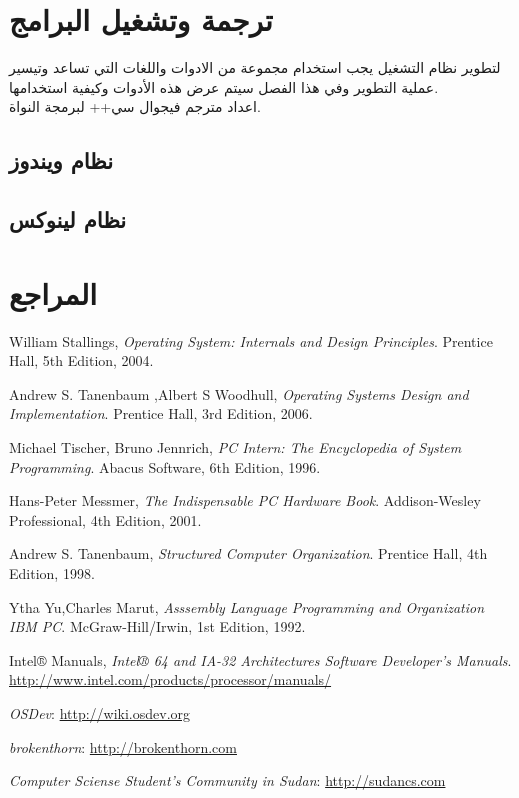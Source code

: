 \documentclass[document.tex]{subfiles}
\begin{document}
\appendix
\chapter{ترجمة وتشغيل البرامج}
\label{apx:compile_link}

لتطوير نظام التشغيل يجب استخدام مجموعة من الادوات واللغات التي تساعد وتيسير عملية التطوير وفي هذا الفصل سيتم عرض هذه الأدوات وكيفية استخدامها.\\

اعداد مترجم فيجوال سي++ لبرمجة النواة.
\section{نظام ويندوز}
\section{نظام لينوكس}

\chapter{المراجع}


\begin{english}
\begin{thebibliography}{10}
 
  William Stallings,
  \emph{Operating System: Internals and Design Principles}.
  Prentice Hall,
  5th Edition,
  2004.
 
  Andrew S. Tanenbaum ,Albert S Woodhull,
  \emph{Operating Systems Design and Implementation}.
  Prentice Hall,
  3rd Edition,
   2006.

  Michael Tischer, Bruno Jennrich,
  \emph{PC Intern: The Encyclopedia of System Programming}.
  Abacus Software,
  6th Edition,
  1996.

  Hans-Peter Messmer,
  \emph{The Indispensable PC Hardware Book}.
  Addison-Wesley Professional,
  4th Edition,
  2001.

  Andrew S. Tanenbaum,
  \emph{Structured Computer Organization}.
  Prentice Hall,
  4th Edition,
  1998.

  Ytha Yu,Charles Marut,
  \emph{Asssembly Language Programming and Organization IBM PC}.
  McGraw-Hill/Irwin,
  1st Edition,
  1992.

  Intel® Manuals,
  \emph{Intel® 64 and IA-32 Architectures Software Developer's Manuals}.
  \url{http://www.intel.com/products/processor/manuals/}


   \emph{OSDev}:
   \url{http://wiki.osdev.org}

  \emph{brokenthorn}:
  \url{http://brokenthorn.com}

  \emph{Computer Sciense Student's Community in Sudan}:
  \url{http://sudancs.com}

\end{thebibliography}
\end{english}
\end{document}
